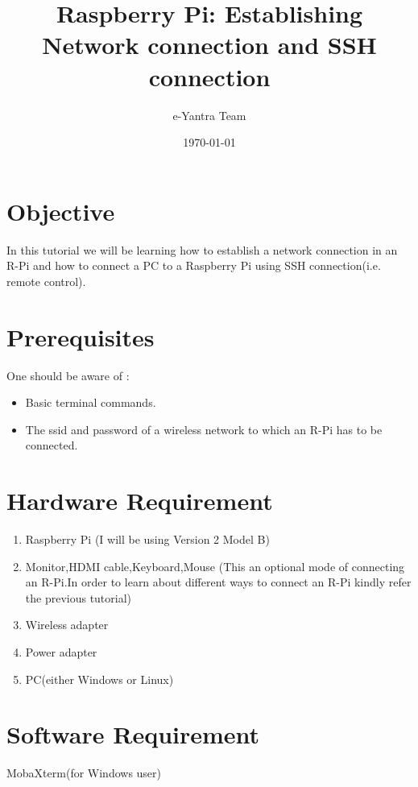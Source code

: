\documentclass[11pt,a4paper]{article}
\title{Raspberry Pi: Establishing Network connection and SSH connection}
\author{e-Yantra Team}
\date{\today}
\begin{document}
	\maketitle
	\newpage
	\tableofcontents
	\newpage
	\section{Objective}
	In this tutorial we will be learning how to establish a network connection in an R-Pi and how to connect a PC to a Raspberry Pi using SSH connection(i.e. remote control).
	\section{Prerequisites}
	One should be aware of :
	\begin{itemize}
		\item Basic terminal commands.
		\item The ssid and password of a wireless network to which an R-Pi has to be connected.
	\end{itemize}
	
	\section{Hardware Requirement}
	\begin{enumerate}
		\item Raspberry Pi (I will be using Version 2 Model B)
		\item Monitor,HDMI cable,Keyboard,Mouse (This an optional mode of connecting an R-Pi.In order to learn about different ways to connect an R-Pi kindly refer the previous tutorial)
		\item Wireless adapter
		\item Power adapter
		\item PC(either Windows or Linux)
	\end{enumerate}
		
	\section{Software Requirement}
	MobaXterm(for Windows user)
	
	\newpage
\end{document}
